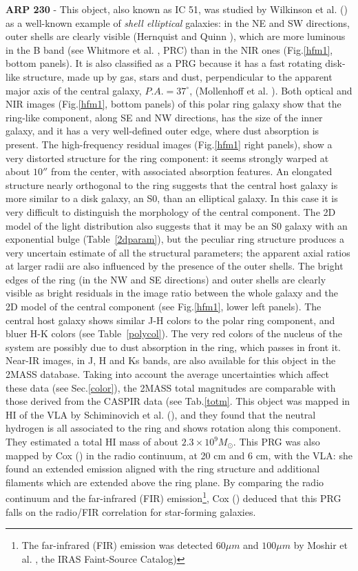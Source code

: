 \documentclass{aa}
\begin{document}
{\bf ARP 230} - 
This object, also known as IC 51, was studied by Wilkinson et
al. (\cite{wilkinson87}) as a well-known example of {\it shell
elliptical} galaxies: in the NE and SW directions, 
outer shells are clearly visible (Hernquist and Quinn \cite{Hernquist88}), 
which are more luminous in the B band 
(see Whitmore et al. \cite{PRC}, PRC) than in the NIR ones
(Fig.\ref{hfm1},  bottom 
panels). It is also classified as a PRG because it has a fast rotating  
disk-like structure, made up by gas, stars and dust, perpendicular to the 
apparent major axis of the central galaxy, $P.A.=37^{\circ}$,  (Mollenhoff
et al. \cite{Mollenhoff92}). Both optical and NIR images (Fig.\ref{hfm1},
bottom panels) of this polar ring  galaxy show that the ring-like
component, along SE and NW directions, has the size of the inner galaxy, 
and it has a very well-defined outer edge, where dust absorption is
present. 
The high-frequency residual images (Fig.\ref{hfm1} right panels), 
show a very distorted  structure for the ring component: 
it seems strongly warped at about $10''$ from the 
center, with associated absorption features.
An elongated structure nearly orthogonal to the ring suggests that the 
central host galaxy is more similar to a disk galaxy, an S0, than an 
elliptical galaxy.
In this case it is very 
difficult to distinguish the morphology of the central component. 
The 2D model of the light distribution also suggests that it may be an S0 
galaxy with an exponential bulge (Table~\ref{2dparam}), but the peculiar ring 
structure produces a very uncertain estimate of all the structural
parameters; the apparent axial  ratios at larger radii are also influenced
by the presence of the outer shells. 
The bright edges of the ring (in the NW and SE directions) and outer 
shells are clearly visible as bright residuals in the image ratio between 
the whole galaxy and the 2D model of the central 
component (see Fig.\ref{hfm1}, lower left panels).
The central host galaxy shows similar J-H colors to the polar ring component, 
and bluer H-K colors (see Table~\ref{polycol}). 
The very red colors of the nucleus of the system are possibly due to dust 
absorption in the ring, which passes in front it.
Near-IR images, in J, H and Ks bands, are also available for this object 
in the 2MASS database. Taking into account the average uncertainties which
affect these data (see Sec.\ref{color}), the 2MASS total magnitudes 
are comparable with those derived from the CASPIR data (see Tab.\ref{totm}.
This object was mapped in HI of the VLA by Schiminovich et al. 
(\cite{Schiminovich97}),  and they found 
that the neutral hydrogen is all associated to the ring and shows
rotation along this component. 
They estimated a total HI mass of about $2.3 \times 10^9 M_{\odot}$.
This PRG was also mapped by Cox (\cite{Cox96}) in the radio continuum, at 20 cm 
and 6 cm, with the VLA:
she found an extended emission aligned with the ring structure and additional 
filaments which are extended above the ring plane. 
By comparing the radio continuum and the far-infrared (FIR) emission\footnote{The 
far-infrared (FIR) emission was detected $60\mu m$ and
$100\mu m$ by Moshir et al. \cite{Moshir90}, the IRAS Faint-Source
Catalog)}, Cox (\cite{Cox96}) deduced that this PRG falls on the radio/FIR
correlation for star-forming galaxies.
\end{document}
